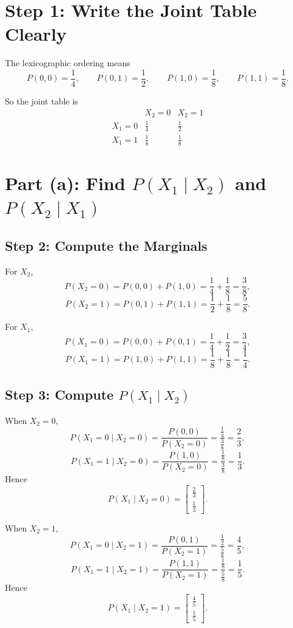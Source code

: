 \documentclass[11pt]{article}
\begin{document}
\section*{Step 1: Write the Joint Table Clearly}

The lexicographic ordering means
\[
    P(0,0)=\frac14,\qquad
    P(0,1)=\frac12,\qquad
    P(1,0)=\frac18,\qquad
    P(1,1)=\frac18.
\]

So the joint table is
\[
\begin{array}{c|cc}
    & X_2=0 & X_2=1\\
    \hline
    X_1=0 & \frac14 & \frac12\\[4pt]
    X_1=1 & \frac18 & \frac18
\end{array}
\]

\section*{Part (a): Find \(P(X_1\mid X_2)\) and \(P(X_2\mid X_1)\)}

\subsection*{Step 2: Compute the Marginals}

For \(X_2\),
\[
    P(X_2=0)=P(0,0)+P(1,0)=\frac14+\frac18=\frac38,
\]
\[
    P(X_2=1)=P(0,1)+P(1,1)=\frac12+\frac18=\frac58.
\]

For \(X_1\),
\[
    P(X_1=0)=P(0,0)+P(0,1)=\frac14+\frac12=\frac34,
\]
\[
    P(X_1=1)=P(1,0)+P(1,1)=\frac18+\frac18=\frac14.
\]

\subsection*{Step 3: Compute \(P(X_1\mid X_2)\)}

When \(X_2=0\),
\[
    P(X_1=0\mid X_2=0)=\frac{P(0,0)}{P(X_2=0)}=\frac{\frac14}{\frac38}=\frac23,
\]
\[
    P(X_1=1\mid X_2=0)=\frac{P(1,0)}{P(X_2=0)}=\frac{\frac18}{\frac38}=\frac13.
\]
Hence
\[
    P(X_1\mid X_2=0)
    =
    \begin{bmatrix}
        \frac23\\[4pt]
        \frac13
    \end{bmatrix}.
\]

When \(X_2=1\),
\[
    P(X_1=0\mid X_2=1)=\frac{P(0,1)}{P(X_2=1)}=\frac{\frac12}{\frac58}=\frac45,
\]
\[
    P(X_1=1\mid X_2=1)=\frac{P(1,1)}{P(X_2=1)}=\frac{\frac18}{\frac58}=\frac15.
\]
Hence
\[
    P(X_1\mid X_2=1)
    =
    \begin{bmatrix}
        \frac45\\[4pt]
        \frac15
    \end{bmatrix}.
\]
\end{document}
